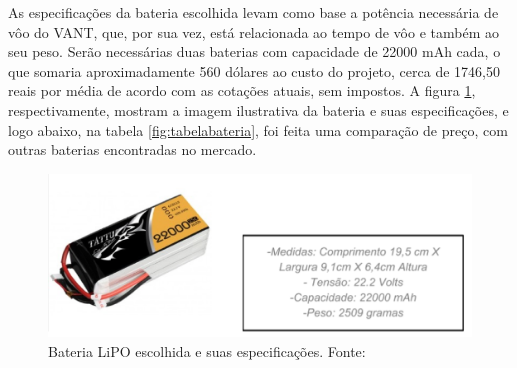 As especificações da bateria escolhida levam como base a potência necessária de vôo do VANT, que, por sua vez, está relacionada ao tempo 
de vôo e também ao seu peso.  Serão necessárias duas baterias com capacidade de 22000 mAh cada, o que somaria aproximadamente 560 dólares
ao custo do projeto, cerca de 1746,50 reais por média de acordo com as cotações atuais, sem impostos. A figura \ref{fig:baterialipo}, respectivamente, 
mostram a imagem ilustrativa da bateria e suas especificações, e logo abaixo, na tabela \ref{fig:tabelabateria}, foi feita uma comparação de preço, com outras 
baterias encontradas no mercado.


\begin{figure}[H]
    \centering
	\includegraphics[keepaspectratio=true,scale=0.6]{figuras/baterialipo.eps}
    \caption{Bateria LiPO escolhida e suas especificações. Fonte: \cite{gensace}}
    \label{fig:baterialipo}
\end{figure}

